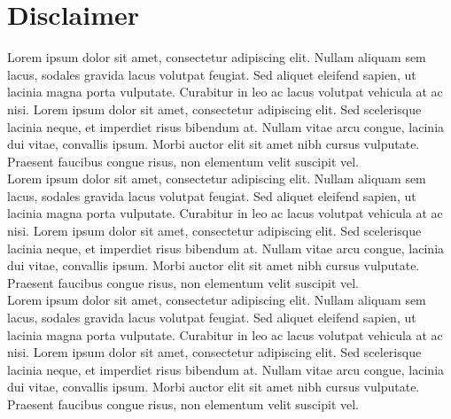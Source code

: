 \chapter*{Disclaimer}

 Lorem ipsum dolor sit amet, consectetur adipiscing elit. Nullam aliquam sem lacus, sodales gravida lacus volutpat feugiat. Sed aliquet eleifend sapien, ut lacinia magna porta vulputate. Curabitur in leo ac lacus volutpat vehicula at ac nisi. Lorem ipsum dolor sit amet, consectetur adipiscing elit. Sed scelerisque lacinia neque, et imperdiet risus bibendum at. Nullam vitae arcu congue, lacinia dui vitae, convallis ipsum. Morbi auctor elit sit amet nibh cursus vulputate. Praesent faucibus congue risus, non elementum velit suscipit vel. \\
Lorem ipsum dolor sit amet, consectetur adipiscing elit. Nullam aliquam sem lacus, sodales gravida lacus volutpat feugiat. Sed aliquet eleifend sapien, ut lacinia magna porta vulputate. Curabitur in leo ac lacus volutpat vehicula at ac nisi. Lorem ipsum dolor sit amet, consectetur adipiscing elit. Sed scelerisque lacinia neque, et imperdiet risus bibendum at. Nullam vitae arcu congue, lacinia dui vitae, convallis ipsum. Morbi auctor elit sit amet nibh cursus vulputate. Praesent faucibus congue risus, non elementum velit suscipit vel. \\

\noindent Lorem ipsum dolor sit amet, consectetur adipiscing elit. Nullam aliquam sem lacus, sodales gravida lacus volutpat feugiat. Sed aliquet eleifend sapien, ut lacinia magna porta vulputate. Curabitur in leo ac lacus volutpat vehicula at ac nisi. Lorem ipsum dolor sit amet, consectetur adipiscing elit. Sed scelerisque lacinia neque, et imperdiet risus bibendum at. Nullam vitae arcu congue, lacinia dui vitae, convallis ipsum. Morbi auctor elit sit amet nibh cursus vulputate. Praesent faucibus congue risus, non elementum velit suscipit vel. 